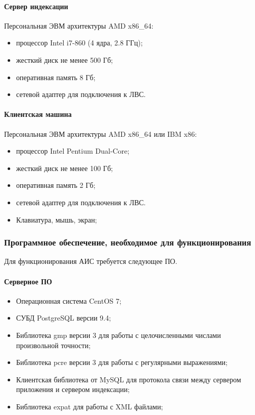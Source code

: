 \paragraph*{Сервер индексации} \hfill

Персональная ЭВМ архитектуры AMD x86\_64:
\begin{itemize}
\item процессор Intel i7-860 (4 ядра, 2.8 ГГц);
\item жесткий диск не менее 500 Гб;
\item оперативная память 8 Гб;
\item сетевой адаптер для подключения к ЛВС.
\end{itemize}

\paragraph*{Клиентская машина} \hfill

Персональная ЭВМ архитектуры AMD x86\_64 или IBM x86:
\begin{itemize}
\item процессор Intel Pentium Dual-Core;
\item жесткий диск не менее 100 Гб;
\item оперативная память 2 Гб;
\item сетевой адаптер для подключения к ЛВС.
\item Клавиатура, мышь, экран;
\end{itemize}


\subsubsection{Программное обеспечение, необходимое для функционирования}

Для функционирования АИС требуется следующее ПО.

  \paragraph*{Серверное ПО} \hfill

  \begin{itemize}
  \item Операционная система CentOS 7;
  \item СУБД PostgreSQL версии 9.4;
  \item Библиотека gmp версии 3 для работы с целочисленными числами произвольной точности;
  \item Библиотека pcre версии 3 для работы с регулярными выражениями;
  \item Клиентская библиотека от MySQL для протокола связи между сервером приложения и сервером индексации;
  \item Библиотека expat для работы с XML файлами;
  \end{itemize}

